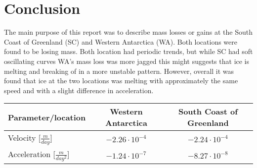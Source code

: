 \section{Conclusion}

The main purpose of this report was to describe mass losses or gains at the South Coast of Greenland (SC) and Western Antarctica (WA). Both locations were found to be losing mass. Both location had periodic trends, but while SC had soft oscillating curves WA's mass loss was more jagged  this might suggests that ice is melting and breaking of in a more unstable pattern. However, overall it was found that ice at the two locations was melting with approximately the same speed and with a slight difference in acceleration. 
\\
\begin{tabular}[H]{|  l || c | c |}
\hline
Parameter/location & Western Antarctica  & South Coast of Greenland \\ \hline \hline
Velocity [$\frac{m}{day}$] &  $-2.26 \cdot 10^{-4}$ & $-2.24 \cdot 10^{-4}$ \\ \hline
Acceleration [$\frac{m}{day^2}$] &  $-1.24 \cdot 10^{-7}$ & $-8.27 \cdot 10^{-8}$ \\
\hline
\end{tabular}
\\
